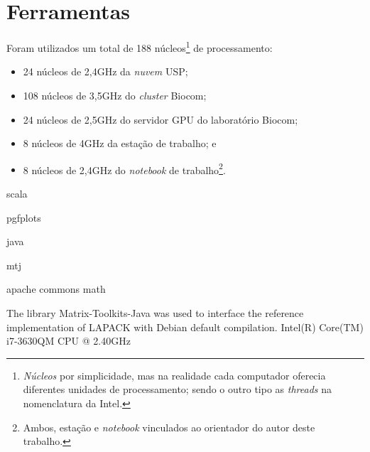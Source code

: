 \section{Ferramentas}\label{sec:ferramentas}
Foram utilizados um total de 188 núcleos\footnote{\textit{Núcleos} por simplicidade,
mas na realidade cada computador oferecia diferentes unidades de processamento;
sendo o outro tipo as \textit{threads} na nomenclatura da Intel.} de processamento:
\begin{itemize}
\item 24 núcleos de 2,4GHz da \textit{nuvem} USP;
\item 108 núcleos de 3,5GHz do \textit{cluster} Biocom;
\item 24 núcleos de 2,5GHz do servidor GPU do laboratório Biocom;
\item 8 núcleos de 4GHz da estação de trabalho; e
\item 8 núcleos de 2,4GHz do \textit{notebook} de trabalho\footnote{Ambos,
estação e \textit{notebook} vinculados ao orientador do autor deste trabalho.}.
\end{itemize}


scala

pgfplots

java

mtj

apache commons math

The library Matrix-Toolkits-Java was used to  interface the reference implementation of LAPACK with Debian default compilation.
Intel(R) Core(TM) i7-3630QM CPU @ 2.40GHz

